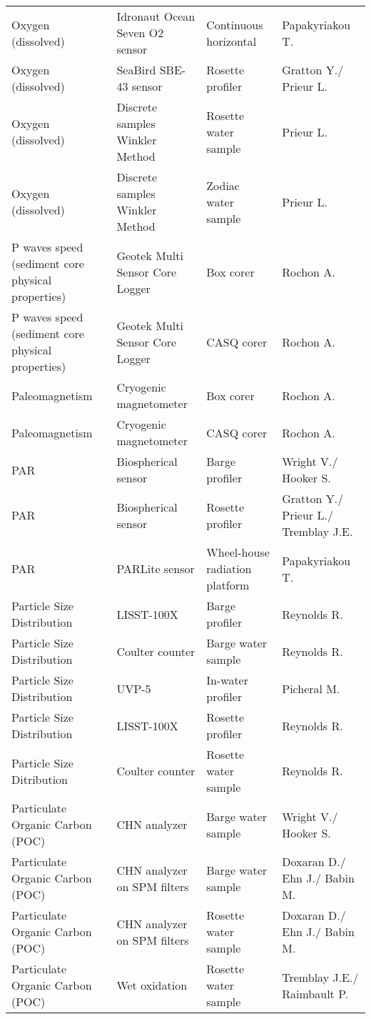 \begin{landscape}
\begin{longtable}[t]{llll}
Oxygen (dissolved) & Idronaut Ocean Seven O2 sensor & Continuous horizontal & Papakyriakou T.\\
\addlinespace
Oxygen (dissolved) & SeaBird SBE-43 sensor & Rosette profiler & Gratton Y./ Prieur L.\\
Oxygen (dissolved) & Discrete samples Winkler Method & Rosette water sample & Prieur L.\\
Oxygen (dissolved) & Discrete samples Winkler Method & Zodiac water sample & Prieur L.\\
P waves speed (sediment core physical properties) & Geotek Multi Sensor Core Logger & Box corer & Rochon A.\\
P waves speed (sediment core physical properties) & Geotek Multi Sensor Core Logger & CASQ corer & Rochon A.\\
\addlinespace
Paleomagnetism & Cryogenic magnetometer & Box corer & Rochon A.\\
Paleomagnetism & Cryogenic magnetometer & CASQ corer & Rochon A.\\
PAR & Biospherical sensor & Barge profiler & Wright V./ Hooker S.\\
PAR & Biospherical sensor & Rosette profiler & Gratton Y./ Prieur L./ Tremblay J.E.\\
PAR & PARLite sensor & Wheel-house radiation platform & Papakyriakou T.\\
\addlinespace
Particle Size Distribution & LISST-100X & Barge profiler & Reynolds R.\\
Particle Size Distribution & Coulter counter & Barge water sample & Reynolds R.\\
Particle Size Distribution & UVP-5 & In-water profiler & Picheral M.\\
Particle Size Distribution & LISST-100X & Rosette profiler & Reynolds R.\\
Particle Size Ditribution & Coulter counter & Rosette water sample & Reynolds R.\\
\addlinespace
Particulate Organic Carbon (POC) & CHN analyzer & Barge water sample & Wright V./ Hooker S.\\
Particulate Organic Carbon (POC) & CHN analyzer on SPM filters & Barge water sample & Doxaran D./ Ehn J./ Babin M.\\
Particulate Organic Carbon (POC) & CHN analyzer on SPM filters & Rosette water sample & Doxaran D./ Ehn J./ Babin M.\\
Particulate Organic Carbon (POC) & Wet oxidation & Rosette water sample & Tremblay J.E./ Raimbault P.\\

\end{longtable}
\end{landscape}
